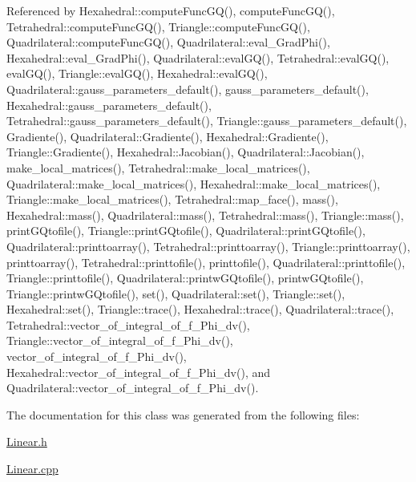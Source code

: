 Referenced by Hexahedral\+::compute\+Func\+G\+Q(), compute\+Func\+G\+Q(), Tetrahedral\+::compute\+Func\+G\+Q(), Triangle\+::compute\+Func\+G\+Q(), Quadrilateral\+::compute\+Func\+G\+Q(), Quadrilateral\+::eval\+\_\+\+Grad\+Phi(), Hexahedral\+::eval\+\_\+\+Grad\+Phi(), Quadrilateral\+::eval\+G\+Q(), Tetrahedral\+::eval\+G\+Q(), eval\+G\+Q(), Triangle\+::eval\+G\+Q(), Hexahedral\+::eval\+G\+Q(), Quadrilateral\+::gauss\+\_\+parameters\+\_\+default(), gauss\+\_\+parameters\+\_\+default(), Hexahedral\+::gauss\+\_\+parameters\+\_\+default(), Tetrahedral\+::gauss\+\_\+parameters\+\_\+default(), Triangle\+::gauss\+\_\+parameters\+\_\+default(), Gradiente(), Quadrilateral\+::\+Gradiente(), Hexahedral\+::\+Gradiente(), Triangle\+::\+Gradiente(), Hexahedral\+::\+Jacobian(), Quadrilateral\+::\+Jacobian(), make\+\_\+local\+\_\+matrices(), Tetrahedral\+::make\+\_\+local\+\_\+matrices(), Quadrilateral\+::make\+\_\+local\+\_\+matrices(), Hexahedral\+::make\+\_\+local\+\_\+matrices(), Triangle\+::make\+\_\+local\+\_\+matrices(), Tetrahedral\+::map\+\_\+face(), mass(), Hexahedral\+::mass(), Quadrilateral\+::mass(), Tetrahedral\+::mass(), Triangle\+::mass(), print\+G\+Qtofile(), Triangle\+::print\+G\+Qtofile(), Quadrilateral\+::print\+G\+Qtofile(), Quadrilateral\+::printtoarray(), Tetrahedral\+::printtoarray(), Triangle\+::printtoarray(), printtoarray(), Tetrahedral\+::printtofile(), printtofile(), Quadrilateral\+::printtofile(), Triangle\+::printtofile(), Quadrilateral\+::printw\+G\+Qtofile(), printw\+G\+Qtofile(), Triangle\+::printw\+G\+Qtofile(), set(), Quadrilateral\+::set(), Triangle\+::set(), Hexahedral\+::set(), Triangle\+::trace(), Hexahedral\+::trace(), Quadrilateral\+::trace(), Tetrahedral\+::vector\+\_\+of\+\_\+integral\+\_\+of\+\_\+f\+\_\+\+Phi\+\_\+dv(), Triangle\+::vector\+\_\+of\+\_\+integral\+\_\+of\+\_\+f\+\_\+\+Phi\+\_\+dv(), vector\+\_\+of\+\_\+integral\+\_\+of\+\_\+f\+\_\+\+Phi\+\_\+dv(), Hexahedral\+::vector\+\_\+of\+\_\+integral\+\_\+of\+\_\+f\+\_\+\+Phi\+\_\+dv(), and Quadrilateral\+::vector\+\_\+of\+\_\+integral\+\_\+of\+\_\+f\+\_\+\+Phi\+\_\+dv().



The documentation for this class was generated from the following files\+:\begin{DoxyCompactItemize}
\item 
\hyperlink{Linear_8h}{Linear.\+h}\item 
\hyperlink{Linear_8cpp}{Linear.\+cpp}\end{DoxyCompactItemize}
